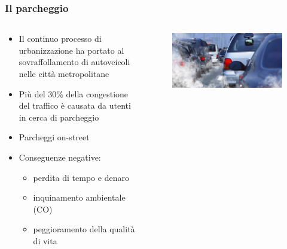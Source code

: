 \documentclass{beamer}
\begin{document}
\begin{frame}
  \frametitle{Il parcheggio}
  \begin{columns}
    \begin{column}{0.55\textwidth}
      \begin{itemize}
	\item Il continuo processo di urbanizzazione ha portato al sovraffollamento di autoveicoli nelle città metropolitane
	\item Più del 30\% della congestione del traffico è causata da utenti in cerca di parcheggio
	\item Parcheggi on-street
	\item Conseguenze negative:
	\begin{itemize}
	  \item perdita di tempo e denaro
	  \item inquinamento ambientale (CO)
	  \item peggioramento della qualità di vita
	\end{itemize}
      \end{itemize}
    \end{column}
    \begin{column}{0.45\textwidth}
      \begin{figure}
	\raggedleft
	\includegraphics[width=\columnwidth]{img/co2.jpg}
      \end{figure}
    \end{column}
  \end{columns}
\end{frame}
\end{document}
